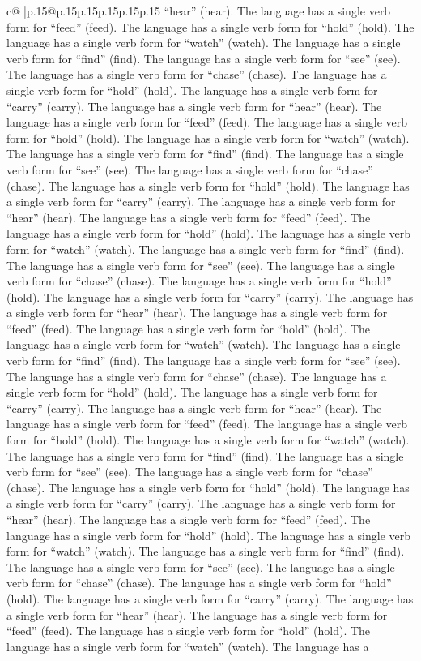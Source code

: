 \documentclass{article}
\begin{document}
{\begin{supertabular}{c@{$\;$}|p{.15\linewidth}@{}p{.15\linewidth}p{.15\linewidth}p{.15\linewidth}p{.15\linewidth}p{.15\linewidth}}
{{{“hear” (hear). The language has a single verb form for “feed” (feed). The language has a single verb form for “hold” (hold). The language has a single verb form for “watch” (watch). The language has a single verb form for “find” (find). The language has a single verb form for “see” (see). The language has a single verb form for “chase” (chase). The language has a single verb form for “hold” (hold). The language has a single verb form for “carry” (carry). The language has a single verb form for “hear” (hear). The language has a single verb form for “feed” (feed). The language has a single verb form for “hold” (hold). The language has a single verb form for “watch” (watch). The language has a single verb form for “find” (find). The language has a single verb form for “see” (see). The language has a single verb form for “chase” (chase). The language has a single verb form for “hold” (hold). The language has a single verb form for “carry” (carry). The language has a single verb form for “hear” (hear). The language has a single verb form for “feed” (feed). The language has a single verb form for “hold” (hold). The language has a single verb form for “watch” (watch). The language has a single verb form for “find” (find). The language has a single verb form for “see” (see). The language has a single verb form for “chase” (chase). The language has a single verb form for “hold” (hold). The language has a single verb form for “carry” (carry). The language has a single verb form for “hear” (hear). The language has a single verb form for “feed” (feed). The language has a single verb form for “hold” (hold). The language has a single verb form for “watch” (watch). The language has a single verb form for “find” (find). The language has a single verb form for “see” (see). The language has a single verb form for “chase” (chase). The language has a single verb form for “hold” (hold). The language has a single verb form for “carry” (carry). The language has a single verb form for “hear” (hear). The language has a single verb form for “feed” (feed). The language has a single verb form for “hold” (hold). The language has a single verb form for “watch” (watch). The language has a single verb form for “find” (find). The language has a single verb form for “see” (see). The language has a single verb form for “chase” (chase). The language has a single verb form for “hold” (hold). The language has a single verb form for “carry” (carry). The language has a single verb form for “hear” (hear). The language has a single verb form for “feed” (feed). The language has a single verb form for “hold” (hold). The language has a single verb form for “watch” (watch). The language has a single verb form for “find” (find). The language has a single verb form for “see” (see). The language has a single verb form for “chase” (chase). The language has a single verb form for “hold” (hold). The language has a single verb form for “carry” (carry). The language has a single verb form for “hear” (hear). The language has a single verb form for “feed” (feed). The language has a single verb form for “hold” (hold). The language has a single verb form for “watch” (watch). The language has a }}}
\end{supertabular}}
\end{document}
